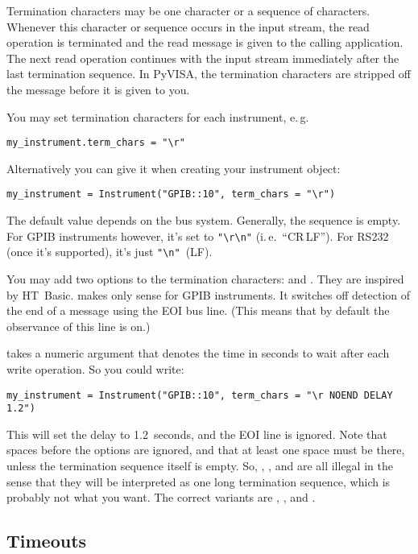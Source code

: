 \documentclass{howto}
\begin{document}
Termination characters may be one character or a sequence of characters.
Whenever this character or sequence occurs in the input stream, the read
operation is terminated and the read message is given to the calling
application.  The next read operation continues with the input stream
immediately after the last termination sequence.  In PyVISA, the termination
characters are stripped off the message before it is given to you.

You may set termination characters for each instrument, e.\,g.
\begin{verbatim}
my_instrument.term_chars = "\r"
\end{verbatim}
Alternatively you can give it when creating your instrument object:
\begin{verbatim}
my_instrument = Instrument("GPIB::10", term_chars = "\r")
\end{verbatim}
The default value depends on the bus system.  Generally, the sequence is empty.
For GPIB instruments however, it's set to \verb|"\r\n"| (i.\,e.~``CR\,LF'')\@.
For RS232 (once it's supported), it's just \verb|"\n"|~(LF)\@.

You may add two options to the termination characters:  and
.  They are inspired by HT~Basic.   makes only sense
for GPIB instruments.  It switches off detection of the end of a message using
the EOI bus line.  (This means that by default the observance of this line is
on.)

 takes a numeric argument that denotes the time in seconds to wait
after each write operation.  So you could write:
\begin{verbatim}
my_instrument = Instrument("GPIB::10", term_chars = "\r NOEND DELAY 1.2")
\end{verbatim}
This will set the delay to 1.2~seconds, and the EOI line is ignored.  Note that
spaces before the options are ignored, and that at least one space must be
there, unless the termination sequence itself is empty.  So, , , and  are all illegal in the sense
that they will be interpreted as one long termination sequence, which is
probably not what you want.  The correct variants are ,
, and .


\subsection{Timeouts}
\label{sec:timeouts}
\end{document}
